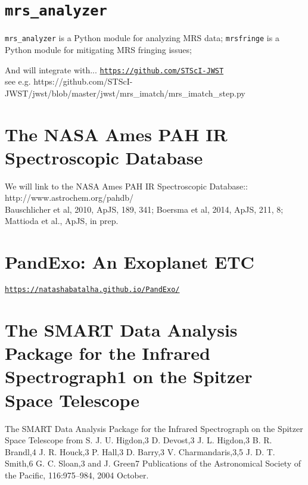 
\section{{\tt mrs\_analyzer}} 
{\tt mrs\_analyzer} is  a Python module for analyzing MRS data; 
{\tt mrsfringe} is a Python module for mitigating MRS fringing issues; 

And will integrate with...
\href{https://github.com/STScI-JWST}{\tt https://github.com/STScI-JWST} \\
see e.g. 
https://github.com/STScI-JWST/jwst/blob/master/jwst/mrs_imatch/mrs_imatch_step.py

\section{The NASA Ames PAH IR Spectroscopic Database}
We will link to the NASA Ames PAH IR Spectroscopic Database:: \\
http://www.astrochem.org/pahdb/ \\
Bauschlicher et al, 2010, ApJS, 189, 341; Boersma et al, 2014, ApJS, 211, 8;  Mattioda et al., ApJS, in prep.\\


\section{PandExo: An Exoplanet ETC}
\href{https://natashabatalha.github.io/PandExo/}{\tt https://natashabatalha.github.io/PandExo/}


\section{The SMART Data Analysis Package for the Infrared Spectrograph1 on the Spitzer Space Telescope}
The SMART Data Analysis Package for the Infrared Spectrograph on the
Spitzer Space Telescope from S. J. U. Higdon,3 D. Devost,3
J. L. Higdon,3 B. R. Brandl,4 J. R. Houck,3 P. Hall,3 D. Barry,3
V. Charmandaris,3,5 J. D. T. Smith,6 G. C. Sloan,3 and J. Green7
Publications of the Astronomical Society of the Pacific, 116:975–984,
2004 October.
